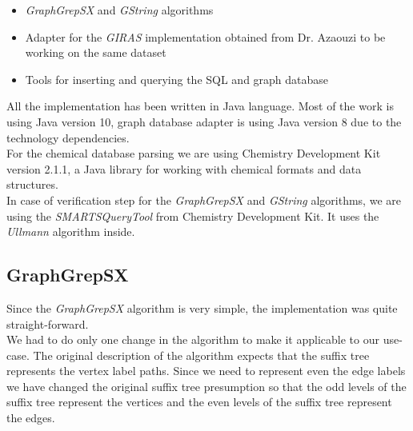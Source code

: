 \begin{itemize}
	\item \textit{GraphGrepSX} and \textit{GString} algorithms
	
	\item Adapter for the \textit{GIRAS} implementation obtained from Dr. Azaouzi to be working on the same dataset
	
	\item Tools for inserting and querying the SQL and graph database
\end{itemize}

All the implementation has been written in Java language\cite{java}. Most of the work is using Java version 10, graph database adapter is using Java version 8 due to the technology dependencies.\\

For the chemical database parsing we are using Chemistry Development \break Kit\cite{CDK} version 2.1.1, a Java library for working with chemical formats and data structures.\\

In case of verification step for the \textit{GraphGrepSX} and \textit{GString} algorithms, we are using the \textit{SMARTSQueryTool} from Chemistry Development Kit. It uses the \textit{Ullmann}\cite{Ullmann} algorithm inside.

\subsection{GraphGrepSX} \label{graphgrep-implementation}

Since the \textit{GraphGrepSX} algorithm is very simple, the implementation was quite straight-forward.\\

We had to do only one change in the algorithm to make it applicable to our use-case. The original description of the algorithm expects that the suffix tree represents the vertex label paths. Since we need to represent even the edge labels we have changed the original suffix tree presumption so that the odd levels of the suffix tree represent the vertices and the even levels of the suffix tree represent the edges.\\

